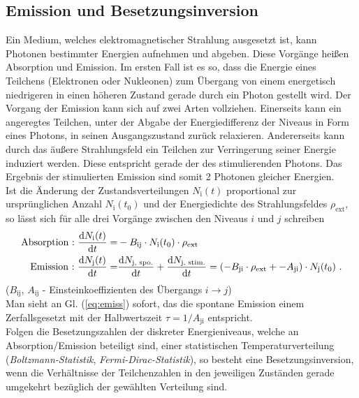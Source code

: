 \documentclass[numbers=noenddot,12pt,a4paper]{scrartcl}
\newcommand{\diff}{\textnormal{d}}
\newcommand{\ix}[1]{_\text{#1}}
\newcommand{\tilt}[1]{\textit{#1}}
\begin{document}
\subsection{Emission und Besetzungsinversion}\label{subsec:besetzinv}
Ein Medium, welches elektromagnetischer Strahlung ausgesetzt ist, kann Photonen bestimmter Energien aufnehmen und abgeben. Diese Vorgänge heißen Absorption und Emission. Im ersten Fall ist es so, dass die Energie eines Teilchens (Elektronen oder Nukleonen) zum Übergang von einem energetisch niedrigeren in einen höheren Zustand gerade durch ein Photon gestellt wird. Der Vorgang der Emission kann sich auf zwei Arten vollziehen. Einerseits kann ein angeregtes Teilchen, unter der Abgabe der Energiedifferenz der Niveaus in Form eines Photons, in seinen Ausgangszustand zurück relaxieren. Andererseits kann durch das äußere Strahlungsfeld ein Teilchen zur Verringerung seiner Energie induziert werden. Diese entspricht gerade der des stimulierenden Photons. Das Ergebnis der stimulierten Emission sind somit 2 Photonen gleicher Energien.\\
Ist die Änderung der Zustandsverteilungen $N\ix{i}(t)$ proportional zur ursprünglichen Anzahl $N\ix{i}(t\ix{0})$ und der Energiedichte des Strahlungsfeldes $\rho\ix{ext}$, so lässt sich für alle drei Vorgänge zwischen den Niveaus $i$ und $j$ schreiben
\begin{align}
	\text{Absorption :} \,\, \frac{\diff N\ix{i}(t)}{\diff t}=&-B\ix{ij}\cdot N\ix{i}(t\ix{0})\cdot \rho\ix{ext} \label{eq:absorp}\\
	\text{Emission :} \,\, \frac{\diff N\ix{j}(t)}{\diff t}=&\frac{\diff N\ix{j, spo.}}{\diff t}+\frac{\diff N\ix{j, stim.}}{\diff t}=\left(-B\ix{ji}\cdot \rho\ix{ext}+-A\ix{ji}\right)\cdot N\ix{j}(t\ix{0}) \label{eq:emiss} \,\,.
\end{align}
($B\ix{ij}$, $A\ix{ij}$ - Einsteinkoeffizienten des Übergangs $i\rightarrow j$) \\
Man sieht an Gl. (\ref{eq:emiss}) sofort, das die spontane Emission einem Zerfallsgesetzt mit der Halbwertszeit $\tau=1/A\ix{ji}$ entspricht.\\
Folgen die Besetzungszahlen der diskreter Energieniveaus, welche an Absorption/Emission beteiligt sind, einer statistischen Temperaturverteilung\\ (\tilt{Boltzmann-Statistik}, \tilt{Fermi-Dirac-Statistik}), so besteht eine Besetzungsinversion, wenn die Verhältnisse der Teilchenzahlen in den jeweiligen Zuständen gerade umgekehrt bezüglich der gewählten Verteilung sind.\\
\end{document}
